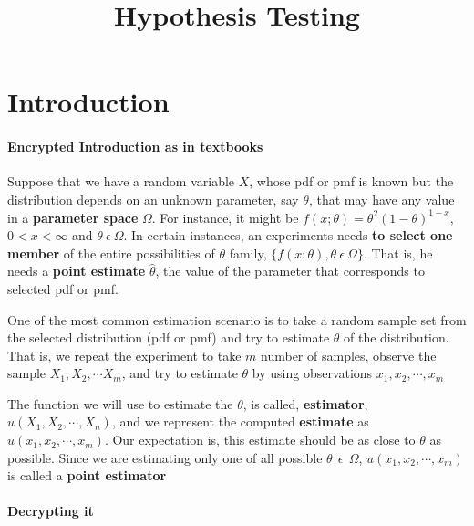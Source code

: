 \documentclass[float=false,crop=false]{standalone}
\title{Hypothesis Testing}
\begin{document}
    
    
    \maketitle
    
    

    
    \section{Introduction}\label{introduction}

\paragraph{Encrypted Introduction as in
textbooks}\label{encrypted-introduction-as-in-textbooks}

Suppose that we have a random variable \(X\), whose pdf or pmf is known
but the distribution depends on an unknown parameter, say \(\theta\),
that may have any value in a \textbf{parameter space} \(\Omega\). For
instance, it might be \(f(x;\theta) = \theta^2(1-\theta)^{1-x}\),
\(0<x<\infty\) and \(\theta \ \epsilon \ \Omega\). In certain instances,
an experiments needs \textbf{to select one member} of the entire
possibilities of \(\theta\) family,
\(\{f(x;\theta),\theta \ \epsilon \ \Omega\}\). That is, he needs a
\textbf{point estimate} \(\hat\theta\), the value of the parameter that
corresponds to selected pdf or pmf.

One of the most common estimation scenario is to take a random sample
set from the selected distribution (pdf or pmf) and try to estimate
\(\theta\) of the distribution. That is, we repeat the experiment to
take \(m\) number of samples, observe the sample
\(X_1, X_2, \cdots X_m\), and try to estimate \(\theta\) by using
observations \(x_1,x_2,\cdots,x_m\)

The function we will use to estimate the \(\theta\), is called,
\textbf{estimator}, \(u(X_1,X_2,\cdots,X_n)\), and we represent the
computed \textbf{estimate} as \(u(x_1,x_2,\cdots,x_m)\). Our expectation
is, this estimate should be as close to \(\theta\) as possible. Since we
are estimating only one of all possible
\(\theta \ \ \epsilon \ \ \Omega\), \(u(x_1,x_2,\cdots,x_m)\) is called
a \textbf{point estimator}

\paragraph{Decrypting it}\label{decrypting-it}
\end{document}
